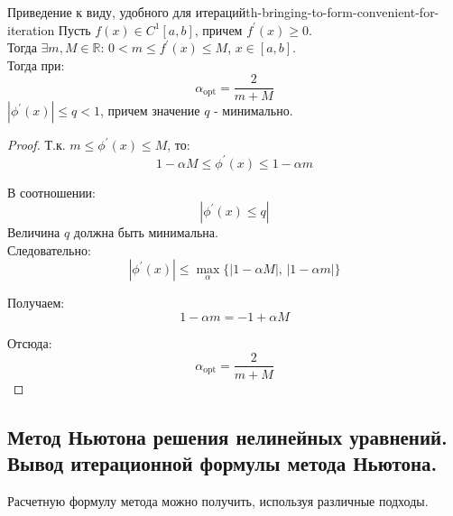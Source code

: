 \documentclass[14pt]{extarticle}
\begin{document}
        \begin{theorem}{Приведение к виду, удобного для итераций}{th-bringing-to-form-convenient-for-iteration}
            Пусть $f(x) \in C^{1}[a, b]$, причем $f^{'}(x) \geq 0$.\\ 
            Тогда $\exists m, M \in \mathbb{R} \text{: } 0 < m \leq f^{'}(x) \leq M$, $x \in [a, b]$.\\
            Тогда при:
            $$\alpha_{\text{opt}} = \frac{2}{m + M}$$
            $|\phi^{'}(x)| \leq q < 1$, причем значение $q$ - минимально.


            \begin{proof}
                Т.к. $m \leq \phi^{'}(x) \leq M$, то:
                $$1 - \alpha M \leq \phi^{'}(x) \leq 1 - \alpha m$$

                В соотношении:
                $$|\phi^{'}(x) \leq q|$$
                Величина $q$ должна быть минимальна.\\

                Следовательно:
                $$|\phi^{'}(x)| \leq \max_{\alpha}\{|1 - \alpha M| \text{, } |1 - \alpha m|\}$$

                Получаем:
                $$1 - \alpha m = -1 + \alpha M$$

                Отсюда:
                $$\alpha_{\text{opt}} = \frac{2}{m + M}$$
            \end{proof}
        \end{theorem}

\clearpage
\subsection{Метод Ньютона решения нелинейных уравнений. Вывод итерационной формулы метода Ньютона.}

    Расчетную формулу метода можно получить, используя различные подходы. 
\end{document}

